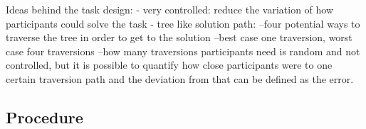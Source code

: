 \documentclass{article}
\begin{document}
Ideas behind the task design:
- very controlled: reduce the variation of how participants could solve the task
- tree like solution path: 
--four potential ways to traverse the tree in order to get to the solution
--best case one traversion, worst case four traversions
--how many traversions participants need is random and not controlled, but it is possible to quantify how close participants were to one certain traversion path and the deviation from that can be defined as the error.


\subsection{Procedure}
\end{document}
